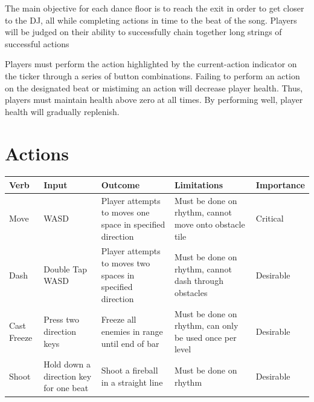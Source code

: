 \documentclass[]{article}
\begin{document}
The main objective for each dance floor is to reach the exit in order
to get closer to the DJ, all while completing actions in time to the
beat of the song. Players will be judged on their ability to
successfully chain together long strings of successful actions

Players must perform the action highlighted by the current-action
indicator on the ticker through a series of button
combinations. Failing to perform an action on the designated beat or
mistiming an action will decrease player health. Thus, players must
maintain health above zero at all times. By performing well, player
health will gradually replenish.

\pagebreak
\section*{Actions}

\begin{table}[h]
\begin{tabular}{|l|L{2cm}|L{4cm}|L{4cm}|l|}
\hline
\textbf{Verb} & \textbf{Input} & \textbf{Outcome}  & \textbf{Limitations} & \textbf{Importance} \\
\hline
Move & WASD  & Player attempts to moves one space in specified direction 
 & Must be done on rhythm, cannot move onto obstacle tile & Critical   \\
\hline
Dash & Double Tap WASD & Player attempts to moves two spaces in 
 specified direction 
 & Must be done on rhythm, cannot dash through obstacles & Desirable   \\
\hline
Cast Freeze & Press two direction keys & Freeze all enemies in range until 
end of bar & Must be done on rhythm, can only be used once per level & 
Desirable\\
\hline
Shoot & Hold down a direction key for one beat & Shoot a fireball in a 
straight line & Must be done on rhythm & Desirable  \\
\hline
\end{tabular}
\end{table}

\pagebreak
\end{document}
